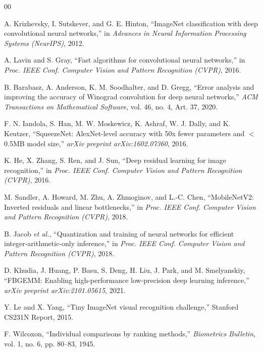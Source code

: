 \documentclass[conference]{IEEEtran}
\begin{document}
\renewcommand{\refname}{Referências}
\begin{thebibliography}{00}

A. Krizhevsky, I. Sutskever, and G. E. Hinton, ``ImageNet classification with deep convolutional
neural networks,'' in \textit{Advances in Neural Information Processing Systems (NeurIPS)}, 2012.

A. Lavin and S. Gray, ``Fast algorithms for convolutional neural networks,'' in \textit{Proc. IEEE
Conf. Computer Vision and Pattern Recognition (CVPR)}, 2016.

B. Barabasz, A. Anderson, K. M. Soodhalter, and D. Gregg, ``Error analysis and improving the
accuracy of Winograd convolution for deep neural networks,'' \textit{ACM Transactions on
Mathematical Software}, vol. 46, no. 4, Art. 37, 2020.

F. N. Iandola, S. Han, M. W. Moskewicz, K. Ashraf, W. J. Dally, and K. Keutzer, ``SqueezeNet:
AlexNet-level accuracy with 50x fewer parameters and $<$0.5MB model size,'' \textit{arXiv preprint
arXiv:1602.07360}, 2016.

K. He, X. Zhang, S. Ren, and J. Sun, ``Deep residual learning for image recognition,'' in
\textit{Proc. IEEE Conf. Computer Vision and Pattern Recognition (CVPR)}, 2016.

M. Sandler, A. Howard, M. Zhu, A. Zhmoginov, and L.-C. Chen, ``MobileNetV2: Inverted residuals and
linear bottlenecks,'' in \textit{Proc. IEEE Conf. Computer Vision and Pattern Recognition (CVPR)},
2018.

B. Jacob \textit{et al.}, ``Quantization and training of neural networks for efficient
integer-arithmetic-only inference,'' in \textit{Proc. IEEE Conf. Computer Vision and Pattern
Recognition (CVPR)}, 2018.

D. Khudia, J. Huang, P. Basu, S. Deng, H. Liu, J. Park, and M. Smelyanskiy, ``FBGEMM: Enabling
high-performance low-precision deep learning inference,'' \textit{arXiv preprint
arXiv:2101.05615}, 2021.

Y. Le and X. Yang, ``Tiny ImageNet visual recognition challenge,'' Stanford CS231N Report, 2015.

F. Wilcoxon, ``Individual comparisons by ranking methods,'' \textit{Biometrics Bulletin}, vol. 1,
no. 6, pp. 80--83, 1945.


\end{thebibliography}
\end{document}
